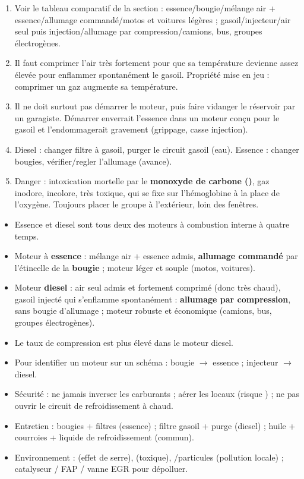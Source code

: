 \documentclass[11pt]{article}
\begin{document}
\begin{corrige}[Exercice n]
\begin{enumerate}
\item Voir le tableau comparatif de la section : essence/bougie/mélange air + essence/allumage commandé/motos et voitures légères ; gasoil/injecteur/air seul puis injection/allumage par compression/camions, bus, groupes électrogènes.
\item Il faut comprimer l'air très fortement pour que sa température devienne assez élevée pour enflammer spontanément le gasoil. Propriété mise en jeu : comprimer un gaz augmente sa température.
\item Il ne doit surtout pas démarrer le moteur, puis faire vidanger le réservoir par un garagiste. Démarrer enverrait l'essence dans un moteur conçu pour le gasoil et l'endommagerait gravement (grippage, casse injection).
\item Diesel : changer filtre à gasoil, purger le circuit gasoil (eau). Essence : changer bougies, vérifier/regler l'allumage (avance).
\item Danger : intoxication mortelle par le \textbf{monoxyde de carbone ()}, gaz inodore, incolore, très toxique, qui se fixe sur l'hémoglobine à la place de l'oxygène. Toujours placer le groupe à l'extérieur, loin des fenêtres.
\end{enumerate}
\end{corrige}

\begin{aretenir}
\begin{itemize}
\item Essence et diesel sont tous deux des moteurs à combustion interne à quatre temps.
\item Moteur à \textbf{essence} : mélange air + essence admis, \textbf{allumage commandé} par l'étincelle de la \textbf{bougie} ; moteur léger et souple (motos, voitures).
\item Moteur \textbf{diesel} : air seul admis et fortement comprimé (donc très chaud), gasoil injecté qui s'enflamme spontanément : \textbf{allumage par compression}, sans bougie d'allumage ; moteur robuste et économique (camions, bus, groupes électrogènes).
\item Le taux de compression est plus élevé dans le moteur diesel.
\item Pour identifier un moteur sur un schéma : bougie $\rightarrow$ essence ; injecteur $\rightarrow$ diesel.
\item Sécurité : ne jamais inverser les carburants ; aérer les locaux (risque ) ; ne pas ouvrir le circuit de refroidissement à chaud.
\item Entretien : bougies + filtres (essence) ; filtre gasoil + purge (diesel) ; huile + courroies + liquide de refroidissement (commun).
\item Environnement :  (effet de serre),  (toxique), /particules (pollution locale) ; catalyseur / FAP / vanne EGR pour dépolluer.
\end{itemize}
\end{aretenir}
\end{document}
